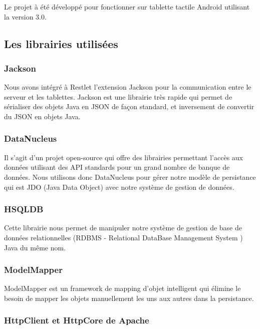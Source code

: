 \documentclass{article}
\begin{document}
Le projet à été développé pour fonctionner sur tablette tactile 
Android utilisant la version 3.0.


\subsection{Les librairies utilisées}

\subsubsection{Jackson}

Nous avons intégré à Restlet l'extension Jackson pour la communication 
entre le serveur et les tablettes. Jackson est une librairie très rapide qui permet 
de sérialiser des objets Java en JSON de façon standard, et inversement de convertir 
du JSON en objets Java.

\subsubsection{DataNucleus}

Il s'agit d'un projet open-source qui offre des librairies permettant 
l'accès aux données utilisant des API standards pour un grand nombre de banque 
de données. Nous utilisons donc DataNucleus pour gérer notre modèle de persistance 
qui est JDO (Java Data Object) avec notre système de gestion de données.

\subsubsection{HSQLDB}

Cette librairie nous permet de manipuler notre système de gestion 
de base de données  relationnelles (RDBMS - Relational DataBase Management System 
) Java du même nom.

\subsubsection{ModelMapper}

ModelMapper est un framework de mapping d'objet intelligent qui 
élimine le besoin de mapper les objets manuellement les uns aux autres dans la 
persistance.

\subsubsection{HttpClient et HttpCore de Apache}
\end{document}
